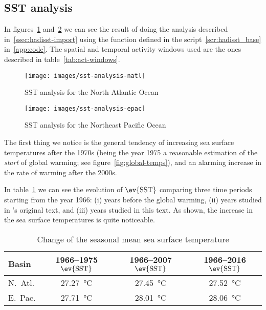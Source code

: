 \subsection{SST analysis}\label{sec:sst-analysis}
In figures~\ref{fig:sst-analysis-natl} and~\ref{fig:sst-analysis-epac} we can see the result of doing the analysis described in~\cref{ssec:hadisst-import} using the function  defined in the script~\ref{scr:hadisst_base} in~\cref{app:code}. The spatial and temporal activity windows used are the ones described in table~\ref{tab:act-windows}.
\begin{figure}[H]
	\centering
	\texttt{[image: images/sst-analysis-natl]}
	\caption{SST analysis for the North Atlantic Ocean}
	\label{fig:sst-analysis-natl}
\end{figure}

\begin{figure}[H]
	\centering
	\texttt{[image: images/sst-analysis-epac]}
	\caption{SST analysis for the Northeast Pacific Ocean}
	\label{fig:sst-analysis-epac}
\end{figure}

The first thing we notice is the general tendency of increasing sea surface temperatures after the 1970s (being the year 1975 a reasonable estimation of the \emph{start} of global warming; see figure~\ref{fig:global-temps}), and an alarming increase in the rate of warming after the 2000s.

In table~\ref{tab:sst-evolution} we can see the evolution of $\ev{\text{SST}}$ comparing three time periods starting from the year 1966: (i) years before the global warming, (ii) years studied in \citeauthor{Corral2010}'s original text, and (iii) years studied in this text. As shown, the increase in the sea surface temperatures is quite noticeable.
\begin{table}[H]
	\centering
	\begin{tabular}{l c c c}
		\toprule
		\toprule
		Basin   & 1966--1975 $\ev{\text{SST}}$ & 1966--2007 $\ev{\text{SST}}$ & 1966--2016 $\ev{\text{SST}}$ \\
		\midrule
		N.~Atl. & \SI{27.27}{\celsius} & \SI{27.45}{\celsius} & \SI{27.52}{\celsius} \\
		E.~Pac. & \SI{27.71}{\celsius} & \SI{28.01}{\celsius} & \SI{28.06}{\celsius} \\
		\bottomrule
	\end{tabular}
	\caption{Change of the seasonal mean sea surface temperature}
	\label{tab:sst-evolution}
\end{table}

